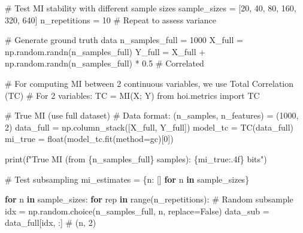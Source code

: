 \documentclass[
  11pt,
  letterpaper,
  oneside,
  openany]{book}
\newenvironment{Shaded}{\begin{snugshade}}{\end{snugshade}}
\newcommand{\BuiltInTok}[1]{\textcolor[rgb]{0.00,0.23,0.31}{#1}}
\newcommand{\CommentTok}[1]{\textcolor[rgb]{0.37,0.37,0.37}{#1}}
\newcommand{\ControlFlowTok}[1]{\textcolor[rgb]{0.00,0.23,0.31}{\textbf{#1}}}
\newcommand{\DecValTok}[1]{\textcolor[rgb]{0.68,0.00,0.00}{#1}}
\newcommand{\FloatTok}[1]{\textcolor[rgb]{0.68,0.00,0.00}{#1}}
\newcommand{\ImportTok}[1]{\textcolor[rgb]{0.00,0.46,0.62}{#1}}
\newcommand{\KeywordTok}[1]{\textcolor[rgb]{0.00,0.23,0.31}{\textbf{#1}}}
\newcommand{\NormalTok}[1]{\textcolor[rgb]{0.00,0.23,0.31}{#1}}
\newcommand{\OperatorTok}[1]{\textcolor[rgb]{0.37,0.37,0.37}{#1}}
\newcommand{\SpecialCharTok}[1]{\textcolor[rgb]{0.37,0.37,0.37}{#1}}
\newcommand{\SpecialStringTok}[1]{\textcolor[rgb]{0.13,0.47,0.30}{#1}}
\newcommand{\StringTok}[1]{\textcolor[rgb]{0.13,0.47,0.30}{#1}}
\newcommand{\VariableTok}[1]{\textcolor[rgb]{0.07,0.07,0.07}{#1}}
\begin{document}
\begin{Shaded}
\begin{Highlighting}[]
\CommentTok{\# Test MI stability with different sample sizes}
\NormalTok{sample\_sizes }\OperatorTok{=}\NormalTok{ [}\DecValTok{20}\NormalTok{, }\DecValTok{40}\NormalTok{, }\DecValTok{80}\NormalTok{, }\DecValTok{160}\NormalTok{, }\DecValTok{320}\NormalTok{, }\DecValTok{640}\NormalTok{]}
\NormalTok{n\_repetitions }\OperatorTok{=} \DecValTok{10}  \CommentTok{\# Repeat to assess variance}

\CommentTok{\# Generate ground truth data}
\NormalTok{n\_samples\_full }\OperatorTok{=} \DecValTok{1000}
\NormalTok{X\_full }\OperatorTok{=}\NormalTok{ np.random.randn(n\_samples\_full)}
\NormalTok{Y\_full }\OperatorTok{=}\NormalTok{ X\_full }\OperatorTok{+}\NormalTok{ np.random.randn(n\_samples\_full) }\OperatorTok{*} \FloatTok{0.5}  \CommentTok{\# Correlated}

\CommentTok{\# For computing MI between 2 continuous variables, we use Total Correlation (TC)}
\CommentTok{\# For 2 variables: TC = MI(X; Y)}
\ImportTok{from}\NormalTok{ hoi.metrics }\ImportTok{import}\NormalTok{ TC}

\CommentTok{\# True MI (use full dataset)}
\CommentTok{\# Data format: (n\_samples, n\_features) = (1000, 2)}
\NormalTok{data\_full }\OperatorTok{=}\NormalTok{ np.column\_stack([X\_full, Y\_full])}
\NormalTok{model\_tc }\OperatorTok{=}\NormalTok{ TC(data\_full)}
\NormalTok{mi\_true }\OperatorTok{=} \BuiltInTok{float}\NormalTok{(model\_tc.fit(method}\OperatorTok{=}\StringTok{\textquotesingle{}gc\textquotesingle{}}\NormalTok{)[}\DecValTok{0}\NormalTok{])}

\BuiltInTok{print}\NormalTok{(}\SpecialStringTok{f"True MI (from }\SpecialCharTok{\{}\NormalTok{n\_samples\_full}\SpecialCharTok{\}}\SpecialStringTok{ samples): }\SpecialCharTok{\{}\NormalTok{mi\_true}\SpecialCharTok{:.4f\}}\SpecialStringTok{ bits"}\NormalTok{)}

\CommentTok{\# Test subsampling}
\NormalTok{mi\_estimates }\OperatorTok{=}\NormalTok{ \{n: [] }\ControlFlowTok{for}\NormalTok{ n }\KeywordTok{in}\NormalTok{ sample\_sizes\}}

\ControlFlowTok{for}\NormalTok{ n }\KeywordTok{in}\NormalTok{ sample\_sizes:}
    \ControlFlowTok{for}\NormalTok{ rep }\KeywordTok{in} \BuiltInTok{range}\NormalTok{(n\_repetitions):}
        \CommentTok{\# Random subsample}
\NormalTok{        idx }\OperatorTok{=}\NormalTok{ np.random.choice(n\_samples\_full, n, replace}\OperatorTok{=}\VariableTok{False}\NormalTok{)}
\NormalTok{        data\_sub }\OperatorTok{=}\NormalTok{ data\_full[idx, :]  }\CommentTok{\# (n, 2)}
        

\end{Highlighting}
\end{Shaded}
\end{document}
